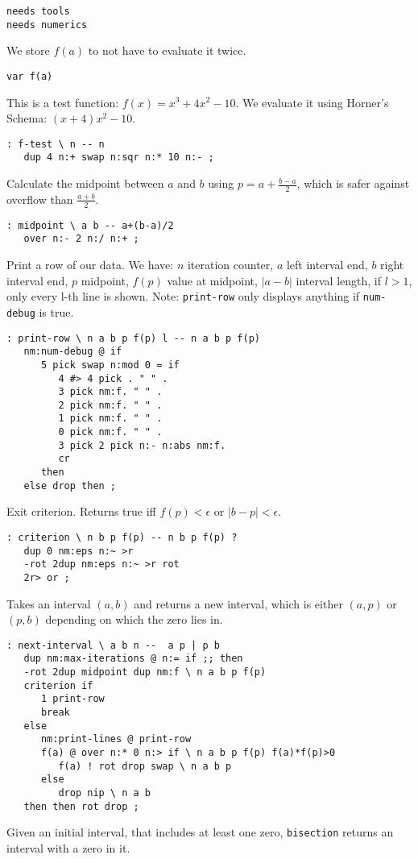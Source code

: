 \documentclass{article}
\begin{document}
\begin{verbatim}
needs tools
needs numerics
\end{verbatim}
We store $f(a)$ to not have to evaluate it twice.
\begin{verbatim}
var f(a) 
\end{verbatim}
This is a test function: $f(x)=x^3+4x^2-10$. We evaluate it using
Horner's Schema: $(x+4)x^2-10$.
\begin{verbatim}
: f-test \ n -- n
   dup 4 n:+ swap n:sqr n:* 10 n:- ;
\end{verbatim}
Calculate the midpoint between $a$ and $b$ using $p=a+\frac{b-a}{2}$,
which is safer against overflow than $\frac{a+b}{2}$.
\begin{verbatim}
: midpoint \ a b -- a+(b-a)/2
   over n:- 2 n:/ n:+ ; 
\end{verbatim}
Print a row of our data. We have: $n$ iteration counter, $a$ left interval 
end, $b$ right interval end, $p$ midpoint, $f(p)$ value at midpoint, $|a-b|$
interval length, if $l>1$, only every l-th line is shown. Note:
\texttt{print-row} only displays anything if \texttt{num-debug} is true.
\begin{verbatim}
: print-row \ n a b p f(p) l -- n a b p f(p)
   nm:num-debug @ if
      5 pick swap n:mod 0 = if
         4 #> 4 pick . " " . 
         3 pick nm:f. " " .
         2 pick nm:f. " " .
         1 pick nm:f. " " .
         0 pick nm:f. " " .
         3 pick 2 pick n:- n:abs nm:f. 
         cr 
      then 
   else drop then ;
\end{verbatim}
Exit criterion. Returns true iff $f(p)<\epsilon$ or $|b-p|<\epsilon$.
\begin{verbatim}
: criterion \ n b p f(p) -- n b p f(p) ?
   dup 0 nm:eps n:~ >r 
   -rot 2dup nm:eps n:~ >r rot 
   2r> or ;
\end{verbatim}
Takes an interval $(a,b)$ and returns a new interval, which is either
$(a,p)$ or $(p,b)$ depending on which the zero lies in. 
\begin{verbatim}
: next-interval \ a b n --  a p | p b
   dup nm:max-iterations @ n:= if ;; then
   -rot 2dup midpoint dup nm:f \ n a b p f(p)
   criterion if 
      1 print-row 
      break 
   else
      nm:print-lines @ print-row
      f(a) @ over n:* 0 n:> if \ n a b p f(p) f(a)*f(p)>0
         f(a) ! rot drop swap \ n a b p 
      else 
         drop nip \ n a b 
   then then rot drop ; 
\end{verbatim}
Given an initial interval, that includes at least one zero,
\texttt{bisection} returns an interval with a zero in it.
\end{document}

